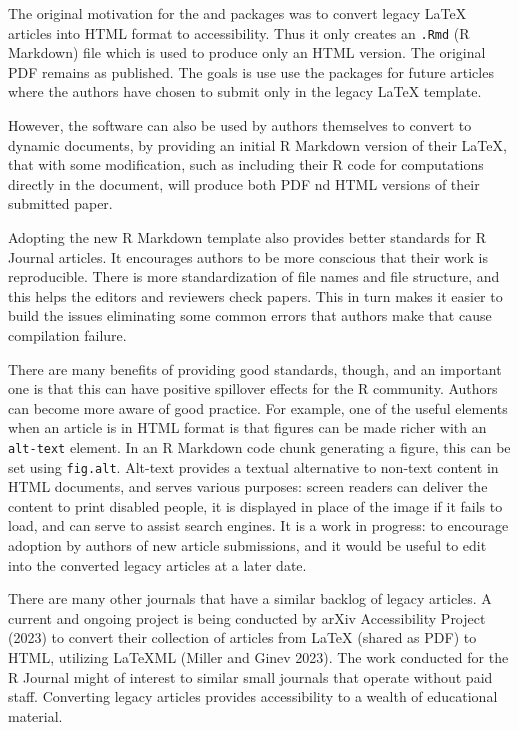 The original motivation for the  and  packages was to convert legacy LaTeX articles into HTML format to accessibility. Thus it only creates an \texttt{.Rmd} (R Markdown) file which is used to produce only an HTML version. The original PDF remains as published. The goals is use use the packages for future articles where the authors have chosen to submit only in the legacy LaTeX template.

However, the software can also be used by authors themselves to convert to dynamic documents, by providing an initial R Markdown version of their LaTeX, that with some modification, such as including their R code for computations directly in the document, will produce both PDF nd HTML versions of their submitted paper.

Adopting the new R Markdown template also provides better standards for R Journal articles. It encourages authors to be more conscious that their work is reproducible. There is more standardization of file names and file structure, and this helps the editors and reviewers check papers. This in turn makes it easier to build the issues eliminating some common errors that authors make that cause compilation failure.

There are many benefits of providing good standards, though, and an important one is that this can have positive spillover effects for the R community. Authors can become more aware of good practice. For example, one of the useful elements when an article is in HTML format is that figures can be made richer with an \texttt{alt-text} element. In an R Markdown code chunk generating a figure, this can be set using \texttt{fig.alt}. Alt-text provides a textual alternative to non-text content in HTML documents, and serves various purposes: screen readers can deliver the content to print disabled people, it is displayed in place of the image if it fails to load, and can serve to assist search engines. It is a work in progress: to encourage adoption by authors of new article submissions, and it would be useful to edit into the converted legacy articles at a later date.

There are many other journals that have a similar backlog of legacy articles. A current and ongoing project is being conducted by arXiv Accessibility Project (2023) to convert their collection of articles from LaTeX (shared as PDF) to HTML, utilizing LaTeXML (Miller and Ginev 2023). The work conducted for the R Journal might of interest to similar small journals that operate without paid staff. Converting legacy articles provides accessibility to a wealth of educational material.

